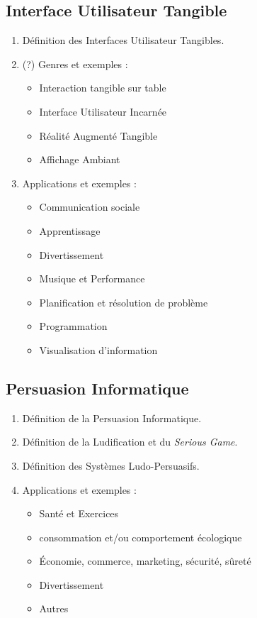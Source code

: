 \documentclass[10pt,a5paper,twoside]{article}
\begin{document}
\subsection{Interface Utilisateur
Tangible}\label{interface-utilisateur-tangible}

\begin{enumerate}
\def\labelenumi{\arabic{enumi}.}
\itemsep1pt\parskip0pt
\item
  Définition des Interfaces Utilisateur Tangibles.
\item
  (?) Genres et exemples :

  \begin{itemize}
  \itemsep1pt\parskip0pt
  \item
    Interaction tangible sur table
  \item
    Interface Utilisateur Incarnée
  \item
    Réalité Augmenté Tangible
  \item
    Affichage Ambiant
  \end{itemize}
\item
  Applications et exemples :

  \begin{itemize}
  \itemsep1pt\parskip0pt
  \item
    Communication sociale
  \item
    Apprentissage
  \item
    Divertissement
  \item
    Musique et Performance
  \item
    Planification et résolution de problème
  \item
    Programmation
  \item
    Visualisation d'information
  \end{itemize}
\end{enumerate}

\subsection{Persuasion Informatique}\label{persuasion-informatique}

\begin{enumerate}
\def\labelenumi{\arabic{enumi}.}
\itemsep1pt\parskip0pt
\item
  Définition de la Persuasion Informatique.
\item
  Définition de la Ludification et du \emph{Serious Game}.
\item
  Définition des Systèmes Ludo-Persuasifs.
\item
  Applications et exemples :

  \begin{itemize}
  \itemsep1pt\parskip0pt
  \item
    Santé et Exercices
  \item
    consommation et/ou comportement écologique
  \item
    Économie, commerce, marketing, sécurité, sûreté
  \item
    Divertissement
  \item
    Autres
  \end{itemize}
\end{enumerate}
\end{document}
